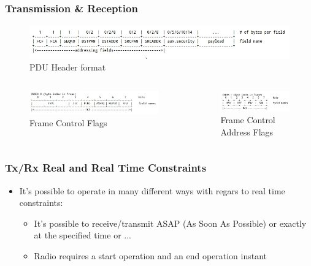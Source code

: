 \begin{frame}[fragile]
  \frametitle{Transmission \& Reception}
  \begin{figure}
  	\centering
  	\includegraphics[width=\textwidth]{img/header.jpg}
  	\caption{PDU Header format}
  \end{figure}
  \begin{columns}
  	\begin{column}{.52\textwidth}
	    \begin{figure}
	    	\includegraphics[width=\textwidth]{img/fcf.jpg}
  		\caption{Frame Control Flags}
	    \end{figure}
  	\end{column}
  	\hfill
	\begin{column}{.45\textwidth}
	    \begin{figure}
	    	\includegraphics[width=\textwidth]{img/fca.jpg}
  		\caption{Frame Control Address Flags}
	    \end{figure}
  	\end{column}
  \end{columns}
\end{frame}

\begin{frame}[fragile]
  \frametitle{Tx/Rx Real and Real Time Constraints}
  \begin{itemize}
    \item It's possible to operate in many different ways with regars to real time constraints:
    \begin{itemize}
    	\item It's possible to receive/transmit ASAP (As Soon As Possible) or exactly at the specified time or ...
    	\item Radio requires a start operation and an end operation instant
    \end{itemize}

  \end{itemize}
\end{frame}